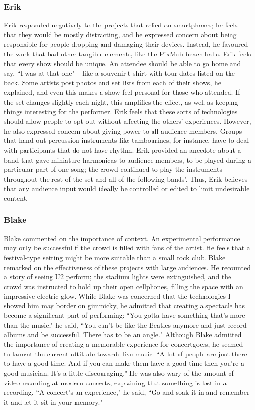 \subsubsection{Erik}
Erik responded negatively to the projects that relied on smartphones; he feels that they would be mostly distracting, and he expressed concern about being responsible for people dropping and damaging their devices. Instead, he favoured the work that had other tangible elements, like the PixMob beach balls. Erik feels that every show should be unique. An attendee should be able to go home and say, ``I was at that one" -- like a souvenir t-shirt with tour dates listed on the back. Some artists post photos and set lists from each of their shows, he explained, and even this makes a show feel personal for those who attended. If the set changes slightly each night, this amplifies the effect, as well as keeping things interesting for the performer. Erik feels that these sorts of technologies should allow people to opt out without affecting the others' experiences. However, he also expressed concern about giving power to all audience members. Groups that hand out percussion instruments like tambourines, for instance, have to deal with participants that do not have rhythm. Erik provided an anecdote about a band that gave miniature harmonicas to audience members, to be played during a particular part of one song; the crowd continued to play the instruments throughout the rest of the set and all of the following bands'. Thus, Erik believes that any audience input would ideally be controlled or edited to limit undesirable content.

\subsubsection{Blake}
Blake commented on the importance of context. An experimental performance may only be successful if the crowd is filled with fans of the artist. He feels that a festival-type setting might be more suitable than a small rock club. Blake remarked on the effectiveness of these projects with large audiences. He recounted a story of seeing U2 perform; the stadium lights were extinguished, and the crowd was instructed to hold up their open cellphones, filling the space with an impressive electric glow. While Blake was concerned that the technologies I showed him may border on gimmicky, he admitted that creating a spectacle has become a significant part of performing: ``You gotta have something that's more than the music," he said, ``You can't be like the Beatles anymore and just record albums and be successful. There has to be an angle." Although Blake admitted the importance of creating a memorable experience for concertgoers, he seemed to lament the current attitude towards live music: ``A lot of people are just there to have a good time. And if you can make them have a good time then you're a good musician. It's a little discouraging." He was also wary of the amount of video recording at modern concerts, explaining that something is lost in a recording. ``A concert's an experience," he said, ``Go and soak it in and remember it and let it sit in your memory."

